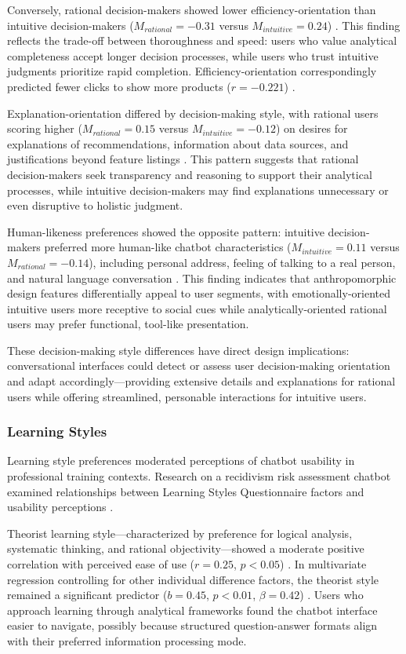 \documentclass[manuscript,anonymous,sigconf]{acmart}
\begin{document}
Conversely, rational decision-makers showed lower efficiency-orientation than intuitive decision-makers ($M_{rational} = -0.31$ versus $M_{intuitive} = 0.24$) \cite{A42}. This finding reflects the trade-off between thoroughness and speed: users who value analytical completeness accept longer decision processes, while users who trust intuitive judgments prioritize rapid completion. Efficiency-orientation correspondingly predicted fewer clicks to show more products ($r = -0.221$) \cite{A42}.

Explanation-orientation differed by decision-making style, with rational users scoring higher ($M_{rational} = 0.15$ versus $M_{intuitive} = -0.12$) on desires for explanations of recommendations, information about data sources, and justifications beyond feature listings \cite{A42}. This pattern suggests that rational decision-makers seek transparency and reasoning to support their analytical processes, while intuitive decision-makers may find explanations unnecessary or even disruptive to holistic judgment.

Human-likeness preferences showed the opposite pattern: intuitive decision-makers preferred more human-like chatbot characteristics ($M_{intuitive} = 0.11$ versus $M_{rational} = -0.14$), including personal address, feeling of talking to a real person, and natural language conversation \cite{A42}. This finding indicates that anthropomorphic design features differentially appeal to user segments, with emotionally-oriented intuitive users more receptive to social cues while analytically-oriented rational users may prefer functional, tool-like presentation.

These decision-making style differences have direct design implications: conversational interfaces could detect or assess user decision-making orientation and adapt accordingly---providing extensive details and explanations for rational users while offering streamlined, personable interactions for intuitive users.

\subsubsection{Learning Styles}

Learning style preferences moderated perceptions of chatbot usability in professional training contexts. Research on a recidivism risk assessment chatbot examined relationships between Learning Styles Questionnaire factors and usability perceptions \cite{A54}.

Theorist learning style---characterized by preference for logical analysis, systematic thinking, and rational objectivity---showed a moderate positive correlation with perceived ease of use ($r = 0.25$, $p < 0.05$) \cite{A54}. In multivariate regression controlling for other individual difference factors, the theorist style remained a significant predictor ($b = 0.45$, $p < 0.01$, $\beta = 0.42$) \cite{A54}. Users who approach learning through analytical frameworks found the chatbot interface easier to navigate, possibly because structured question-answer formats align with their preferred information processing mode.
\end{document}
